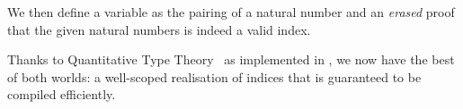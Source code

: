 
\noindent
We then define a variable as the pairing of a natural number and an \emph{erased}
proof that the given natural numbers is indeed a valid \DeBruijn{} index.


Thanks to Quantitative Type Theory~\cite{DBLP:conf/birthday/McBride16,DBLP:conf/lics/Atkey18}
as implemented in \Idris{},
we now have the best of both worlds: a well-scoped realisation of \DeBruijn{} indices
that is guaranteed to be compiled efficiently.


